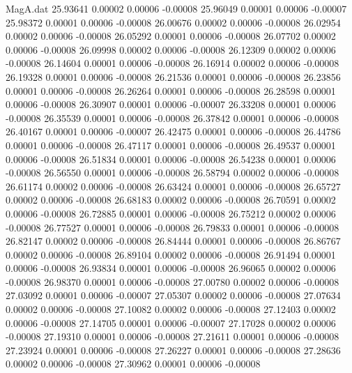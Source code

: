 \begin{filecontents}{MagA.dat}
  25.93641    0.00002    0.00006   -0.00008
  25.96049    0.00001    0.00006   -0.00007
  25.98372    0.00001    0.00006   -0.00008
  26.00676    0.00002    0.00006   -0.00008
  26.02954    0.00002    0.00006   -0.00008
  26.05292    0.00001    0.00006   -0.00008
  26.07702    0.00002    0.00006   -0.00008
  26.09998    0.00002    0.00006   -0.00008
  26.12309    0.00002    0.00006   -0.00008
  26.14604    0.00001    0.00006   -0.00008
  26.16914    0.00002    0.00006   -0.00008
  26.19328    0.00001    0.00006   -0.00008
  26.21536    0.00001    0.00006   -0.00008
  26.23856    0.00001    0.00006   -0.00008
  26.26264    0.00001    0.00006   -0.00008
  26.28598    0.00001    0.00006   -0.00008
  26.30907    0.00001    0.00006   -0.00007
  26.33208    0.00001    0.00006   -0.00008
  26.35539    0.00001    0.00006   -0.00008
  26.37842    0.00001    0.00006   -0.00008
  26.40167    0.00001    0.00006   -0.00007
  26.42475    0.00001    0.00006   -0.00008
  26.44786    0.00001    0.00006   -0.00008
  26.47117    0.00001    0.00006   -0.00008
  26.49537    0.00001    0.00006   -0.00008
  26.51834    0.00001    0.00006   -0.00008
  26.54238    0.00001    0.00006   -0.00008
  26.56550    0.00001    0.00006   -0.00008
  26.58794    0.00002    0.00006   -0.00008
  26.61174    0.00002    0.00006   -0.00008
  26.63424    0.00001    0.00006   -0.00008
  26.65727    0.00002    0.00006   -0.00008
  26.68183    0.00002    0.00006   -0.00008
  26.70591    0.00002    0.00006   -0.00008
  26.72885    0.00001    0.00006   -0.00008
  26.75212    0.00002    0.00006   -0.00008
  26.77527    0.00001    0.00006   -0.00008
  26.79833    0.00001    0.00006   -0.00008
  26.82147    0.00002    0.00006   -0.00008
  26.84444    0.00001    0.00006   -0.00008
  26.86767    0.00002    0.00006   -0.00008
  26.89104    0.00002    0.00006   -0.00008
  26.91494    0.00001    0.00006   -0.00008
  26.93834    0.00001    0.00006   -0.00008
  26.96065    0.00002    0.00006   -0.00008
  26.98370    0.00001    0.00006   -0.00008
  27.00780    0.00002    0.00006   -0.00008
  27.03092    0.00001    0.00006   -0.00007
  27.05307    0.00002    0.00006   -0.00008
  27.07634    0.00002    0.00006   -0.00008
  27.10082    0.00002    0.00006   -0.00008
  27.12403    0.00002    0.00006   -0.00008
  27.14705    0.00001    0.00006   -0.00007
  27.17028    0.00002    0.00006   -0.00008
  27.19310    0.00001    0.00006   -0.00008
  27.21611    0.00001    0.00006   -0.00008
  27.23924    0.00001    0.00006   -0.00008
  27.26227    0.00001    0.00006   -0.00008
  27.28636    0.00002    0.00006   -0.00008
  27.30962    0.00001    0.00006   -0.00008

\end{filecontents}

